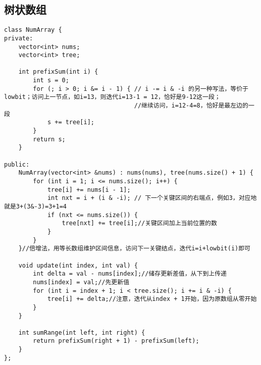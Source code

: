 \documentclass[12pt,a4paper,UTF16]{ctexbook}
\theoremstyle{plain}
\begin{document}
\subsection{树状数组}
\begin{lstlisting}
class NumArray {
private:
    vector<int> nums;
    vector<int> tree;

    int prefixSum(int i) {
        int s = 0;
        for (; i > 0; i &= i - 1) { // i -= i & -i 的另一种写法，等价于lowbit；访问上一节点，如i=13，则迭代i=13-1 = 12，恰好是9-12这一段；
                                    //继续访问，i=12-4=8，恰好是最左边的一段
            s += tree[i];
        }
        return s;
    }

public:
    NumArray(vector<int> &nums) : nums(nums), tree(nums.size() + 1) {
        for (int i = 1; i <= nums.size(); i++) {
            tree[i] += nums[i - 1];
            int nxt = i + (i & -i); // 下一个关键区间的右端点，例如3，对应地就是3+(3&-3)=3+1=4
            if (nxt <= nums.size()) {
                tree[nxt] += tree[i];//关键区间加上当前位置的数
            }
        }
    }//倍增法，用等长数组维护区间信息，访问下一关键结点，迭代i=i+lowbit(i)即可

    void update(int index, int val) {
        int delta = val - nums[index];//储存更新差值，从下到上传递
        nums[index] = val;//先更新值
        for (int i = index + 1; i < tree.size(); i += i & -i) {
            tree[i] += delta;//注意，迭代从index + 1开始，因为原数组从零开始
        }
    }

    int sumRange(int left, int right) {
        return prefixSum(right + 1) - prefixSum(left);
    }
};
\end{lstlisting}
\end{document}
